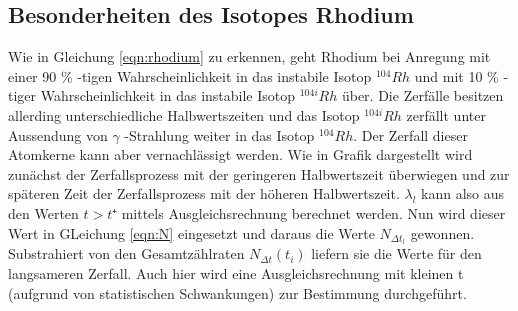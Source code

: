 \subsection{Besonderheiten des Isotopes Rhodium}
    Wie in Gleichung \ref{eqn:rhodium} zu erkennen, geht Rhodium bei Anregung mit einer 90 \% -tigen
    Wahrscheinlichkeit in das instabile Isotop $^{104}Rh$ und mit 10 \% -tiger Wahrscheinlichkeit 
    in das instabile Isotop $^{104i}Rh$ über. Die Zerfälle besitzen allerding unterschiedliche 
    Halbwertszeiten und das Isotop $^{104i}Rh$ zerfällt unter Aussendung von $\gamma$ -Strahlung 
    weiter in das Isotop $^{104}Rh$. Der Zerfall dieser Atomkerne kann aber vernachlässigt werden.
    Wie in Grafik dargestellt wird zunächst der Zerfallsprozess mit der geringeren Halbwertszeit
    überwiegen und zur späteren Zeit der Zerfallsprozess mit der höheren Halbwertszeit. 
    $\lambda_l$ kann also aus den Werten $t > t⁺$ mittels Ausgleichsrechnung berechnet werden. 
    Nun wird dieser Wert in GLeichung \ref{eqn:N} eingesetzt und daraus die Werte $N_{\Delta t_l}$
    gewonnen. Substrahiert von den Gesamtzählraten $N_{\Delta t}(t_i)$ liefern sie die Werte für den 
    langsameren Zerfall. Auch hier wird eine Ausgleichsrechnung mit kleinen t (aufgrund von 
    statistischen Schwankungen) zur Bestimmung durchgeführt. 
    
    